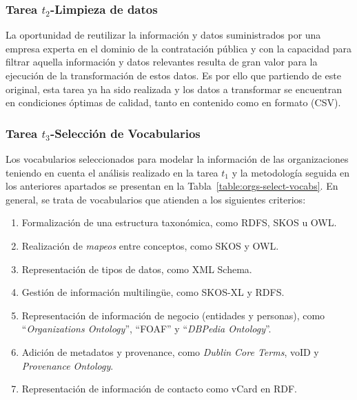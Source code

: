 \subsubsection{Tarea $t_2$-Limpieza de datos}
La oportunidad de reutilizar la información y datos suministrados por una empresa experta en el dominio de la 
contratación pública y con la capacidad para filtrar aquella información y datos relevantes resulta de gran 
valor para la ejecución de la transformación de estos datos. Es por ello que partiendo de este \dataset 
original, esta tarea ya ha sido realizada y los datos a transformar se encuentran en condiciones óptimas 
de calidad, tanto en contenido como en formato (\gls{CSV}).

\subsubsection{Tarea $t_3$-Selección de Vocabularios}
Los vocabularios seleccionados para modelar la información de las organizaciones teniendo en cuenta el análisis 
realizado en la tarea $t_1$ y la metodología seguida en los anteriores apartados se presentan en la Tabla~\ref{table:orgs-select-vocabs}. 
En general, se trata de vocabularios que atienden a los siguientes criterios:

\begin{enumerate}
 \item Formalización de una estructura taxonómica, como RDFS, \gls{SKOS} u \gls{OWL}.
 \item Realización de \textit{mapeos} entre conceptos, como SKOS y OWL.
 \item Representación de tipos de datos, como \gls{XML Schema}.
 \item Gestión de información multiling\"{u}e, como SKOS-XL y RDFS.
 \item Representación de información de negocio (entidades y personas), como ``\textit{Organizations Ontology}'', ``\gls{FOAF}'' y ``\textit{DBPedia Ontology}''.
 \item Adición de metadatos y provenance, como \textit{Dublin Core Terms}, \gls{voID} y \textit{Provenance Ontology}.
 \item Representación de información de contacto como vCard en RDF.
\end{enumerate}


